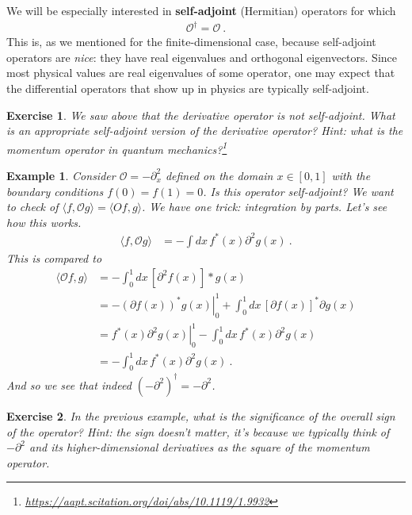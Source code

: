 \documentclass[
  11pt,
	colorful,
	raggedright,
]{tufte-style-thesis-flip}
\newtheorem{exercise}{Exercise}[section]
\newtheorem{example}{Example}[section]
\begin{document}
We will be especially interested in \textbf{self-adjoint} (Hermitian) operators for which
\begin{align}
  \mathcal O^\dag = \mathcal O \ .
\end{align}
This is, as we mentioned for the finite-dimensional case, because self-adjoint operators are \emph{nice}: they have real eigenvalues and orthogonal eigenvectors. Since most physical values are real eigenvalues of some operator, one may expect that the differential operators that show up in physics are typically self-adjoint.
\begin{exercise}
We saw above that the derivative operator is not self-adjoint. What is an appropriate self-adjoint version of the derivative operator? \emph{Hint: what is the momentum operator in quantum mechanics?}\footnote{\url{https://aapt.scitation.org/doi/abs/10.1119/1.9932}} 
\end{exercise}
\begin{example}
Consider $\mathcal O = -\partial_x^2$ defined on the domain $x\in [0,1]$ with the boundary conditions $f(0)=f(1)=0$. Is this operator self-adjoint? We want to check of $\langle f,\mathcal O g\rangle = \langle O f, g \rangle$. We have one trick: integration by parts. Let's see how this works.
\begin{align}
  \langle f, \mathcal O g\rangle &= - \int dx\, f^*(x)\partial^2 g(x) \ .
\end{align}
This is compared to
\begin{align}
  \langle \mathcal O f, g\rangle 
  &= -\int^1_0 dx\, \left[\partial^2 f(x)\right]*g(x) 
  \\
  &= 
  -\left.\left(\partial f(x)\right)^*g(x)\right|^1_0
  + \int^1_0 dx \, \left[\partial f(x)\right]^* \partial g(x) 
  \\
  &= \left.f^*(x)\partial^2 g(x)\right|^1_0
  - \int^1_0 dx \, f^*(x) \partial^2 g(x)  
  \\
  &=
  - \int^1_0 dx \, f^*(x) \partial^2 g(x)  
  \ .
\end{align}
And so we see that indeed $(-\partial^2)^\dag = -\partial^2$.
\end{example}
\begin{exercise}
In the previous example, what is the significance of the overall sign of the operator? \emph{Hint: the sign doesn't matter, it's because we typically think of $-\partial^2$ and its higher-dimensional derivatives as the square of the momentum operator.}
\end{exercise}
\end{document}
